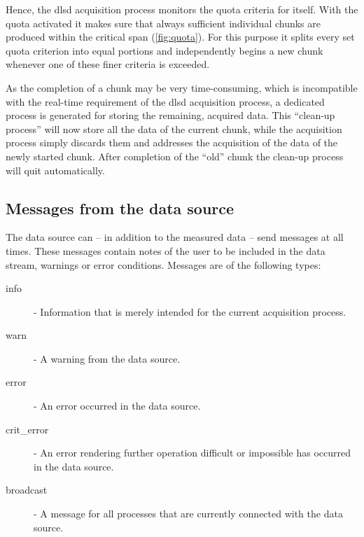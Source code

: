 \documentclass[a4paper,12pt,BCOR6mm,bibtotoc,idxtotoc]{scrbook}
\begin{document}
Hence, the dlsd acquisition process monitors the quota criteria for itself.
With the quota activated it makes sure that always sufficient individual
chunks are produced within the critical span (\autoref{fig:quota}). For this
purpose it splits every set quota criterion into equal portions and
independently begins a new chunk whenever one of these finer criteria is
exceeded.

As the completion of a chunk may be very time-consuming, which is
incompatible with the real-time requirement of the dlsd acquisition process, a
dedicated process is generated for storing the remaining, acquired data. This
``clean-up process'' will now store all the data of
the current chunk, while the acquisition process simply discards them and
addresses the acquisition of the data of the newly started chunk. After
completion of the ``old'' chunk the clean-up process will quit automatically.


\subsection{Messages from the data source}
\label{sec:dlsd_logger_msg}

The data source can -- in addition to the measured data -- send
messages at all times. These messages contain notes of the
user to be included in the data stream, warnings or error conditions. Messages
are of the following types:

\begin{description}

\item[info] - Information that is merely intended for the current acquisition
process.

\item[warn] - A warning from the data source.

\item[error] - An error occurred in the data source.

\item[crit\_error] - An error rendering further operation difficult or
impossible has occurred in the data source.

\item[broadcast] - A message for all processes that are currently connected
with the data source.

\end{description}
\end{document}
